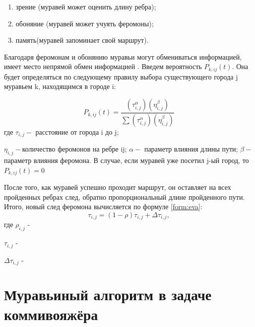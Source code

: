 \documentclass[a4paper,12pt]{report}
\begin{document}
   			\begin{enumerate}
   				\item зрение (муравей может оценить длину ребра);
   				\item обоняние (муравей может учуять феромоны);
   				\item память(муравей запоминает свой маршрут).
   			\end{enumerate}
   		
   			Благодаря феромонам и обонянию муравьи могут обмениваться информацией, имеет место непрямой обмен информацией \cite{shtovba}.
   			Введем вероятность $P_{k, ij}(t)$.
   			Она будет определяться по следующему правилу выбора существующего города j муравьем k, находящимся в городе i:
   			
   			\begin{equation}
   				P_{k, ij}(t)=
   				{\frac {(\tau _{i,j}^{\alpha })(\eta _{i,j}^{\beta })}{\sum (\tau _{i,j}^{\alpha })(\eta _{i,j}^{\beta })}}
   			\end{equation}
   			где \quad$ \tau _{i,j} - $ расстояние от города i до j;
   			
   			$\eta _{i,j} - $количество феромонов на ребре ij;
   			$\alpha - $ параметр влияния длины пути;
   			$\beta - $ параметр влияния феромона.
   			В случае, если муравей уже посетил j-ый город, то $P_{k, ij}(t) = 0$
   			
   			\vspace{0.5cm}
   			После того, как муравей успешно проходит маршрут, он оставляет на всех пройденных ребрах след, обратно пропорциональный длине пройденного пути. Итого, новый след феромона вычисляется по формуле \ref{form:eva}:
   			\begin{equation}\label{form:eva} 
   			\tau _{i,j}=(1-\rho )\tau _{i,j}+\Delta \tau _{i,j},
   			\end{equation}
   			где \quad$ \rho _{i,j}$ -  
   			
   			$\tau _{i,j}$ -  
   			
   			$\Delta \tau _{i,j}$ - 
   	
   		\newpage
   	
   		\section{Муравьиный алгоритм в задаче коммивояжёра}
\end{document}
